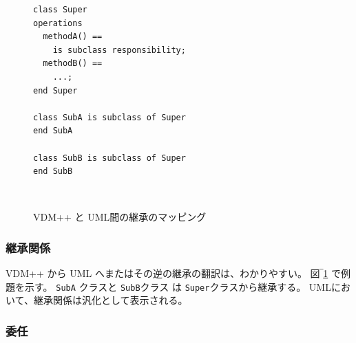 \documentclass[\pformat,12pt]{jarticle}
\newcommand{\vdmpp}{VDM++}
\begin{document}
\begin{figure}[h]
\vspace{1cm}
\begin{center}
\begin{minipage}[h]{2.5in}
\begin{verbatim}  
class Super  
operations
  methodA() ==  
    is subclass responsibility;  
  methodB() ==  
    ...;  
end Super  
  
class SubA is subclass of Super  
end SubA  
  
class SubB is subclass of Super  
end SubB  
\end{verbatim}
\end{minipage} \ \
\hspace{1cm}
\begin{minipage}[h]{2.5in}
\vspace{1cm}
\end{minipage}
\caption{\vdmpp{} と UML間の継承のマッピング　\label{fig:super}}
\end{center}
\end{figure}

\subsubsection*{継承関係}
\label{inheritance}

 \vdmpp{} から UML へまたはその逆の継承の翻訳は、わかりやすい。
図‾\ref{fig:super} で例題を示す。
{\tt SubA} クラスと {\tt SubB}クラス は {\tt Super}クラスから継承する。
UMLにおいて、継承関係は汎化として表示される。
  
\subsubsection*{委任}
\end{document}
